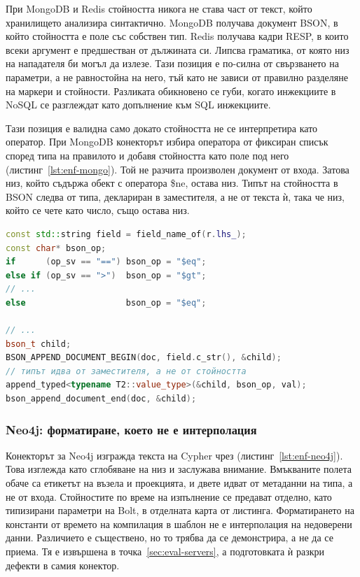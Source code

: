 При MongoDB и Redis стойността никога не става част от текст, който хранилището
анализира синтактично. MongoDB получава документ BSON, в който стойността е
поле със собствен тип. Redis получава кадри RESP, в които всеки аргумент е
предшестван от дължината си. Липсва граматика, от която низ на нападателя би
могъл да излезе. Тази позиция е по-силна от свързването на параметри, а не
равностойна на него, тъй като не зависи от правилно разделяне на маркери и
стойности. Разликата обикновено се губи, когато инжекциите в NoSQL се разглеждат
като допълнение към SQL инжекциите.

Тази позиция е валидна само докато стойността не се интерпретира като оператор.
При MongoDB конекторът избира оператора от фиксиран списък според типа на
правилото и добавя стойността като поле под него
(листинг~\ref{lst:enf-mongo}). Той не разчита произволен документ от входа.
Затова низ, който съдържа обект с оператора {\ttfamily \$ne}, остава низ. Типът
на стойността в BSON следва от типа, деклариран в заместителя, а не от текста ѝ,
така че низ, който се чете като число, също остава низ.

\begin{lstlisting}[language=C++,caption={MongoDB: операторът е от фиксиран списък, стойността е поле (съкратено)},label={lst:enf-mongo}]
const std::string field = field_name_of(r.lhs_);
const char* bson_op;
if      (op_sv == "==") bson_op = "$eq";
else if (op_sv == ">")  bson_op = "$gt";
// ...
else                    bson_op = "$eq";

// ...
bson_t child;
BSON_APPEND_DOCUMENT_BEGIN(doc, field.c_str(), &child);
// типът идва от заместителя, а не от стойността
append_typed<typename T2::value_type>(&child, bson_op, val);
bson_append_document_end(doc, &child);
\end{lstlisting}


\subsubsection{Neo4j: форматиране, което не е интерполация}

Конекторът за Neo4j изгражда текста на Cypher чрез 
(листинг~\ref{lst:enf-neo4j}). Това изглежда като сглобяване на низ и заслужава
внимание. Вмъкваните полета обаче са
етикетът на възела и проекцията, и двете идват от  метаданни на
типа, а не от входа. Стойностите по време на изпълнение се предават отделно,
като типизирани параметри на Bolt, в отделната карта от листинга. Форматирането на
константи от времето на компилация в шаблон не е интерполация на недоверени
данни. Различието е съществено, но то трябва да се демонстрира, а не да се
приема. Тя е извършена в точка~\ref{sec:eval-servers}, а подготовката ѝ разкри
дефекти в самия конектор.

